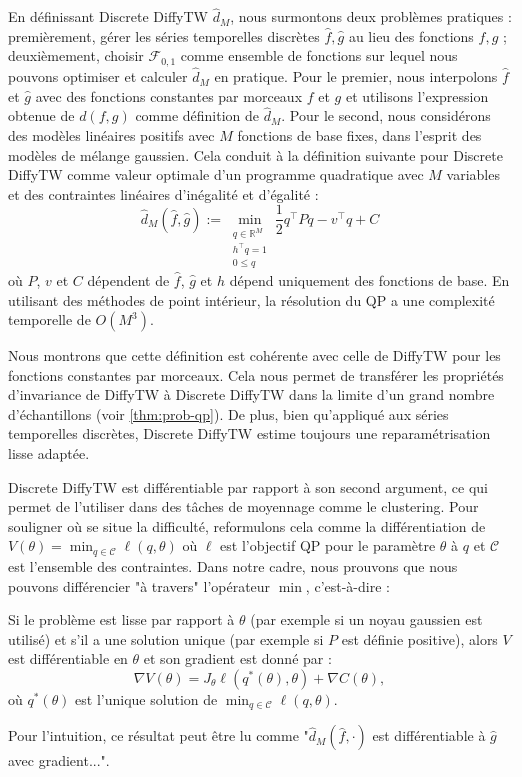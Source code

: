 En définissant Discrete DiffyTW $\hat d_M$, nous surmontons deux problèmes pratiques : premièrement, gérer les séries temporelles discrètes $\hat f, \hat g$ au lieu des fonctions $f, g$ ; deuxièmement, choisir $\mathcal F_{0,1}$ comme ensemble de fonctions sur lequel nous pouvons optimiser et calculer $\hat d_M$ en pratique. Pour le premier, nous interpolons $\hat f$ et $\hat g$ avec des fonctions constantes par morceaux $f$ et $g$ et utilisons l'expression obtenue de $d(f, g)$ comme définition de $\hat d_M$. Pour le second, nous considérons des modèles linéaires positifs avec $M$ fonctions de base fixes, dans l'esprit des modèles de mélange gaussien. Cela conduit à la définition suivante pour Discrete DiffyTW comme valeur optimale d'un programme quadratique avec $M$ variables et des contraintes linéaires d'inégalité et d'égalité :
\begin{equation*}
    \hat d_M(\hat f, \hat g) :=\min_{\substack{q\in\mathbb R^{M}\\h^\top q=1\\0 \leq q}}\frac{1}{2}q^\top Pq - v^\top q + C
\end{equation*}
où $P$, $v$ et $C$ dépendent de $\hat f$, $\hat g$ et $h$ dépend uniquement des fonctions de base. En utilisant des méthodes de point intérieur, la résolution du QP a une complexité temporelle de $O(M^3)$.

Nous montrons que cette définition est cohérente avec celle de DiffyTW pour les fonctions constantes par morceaux. Cela nous permet de transférer les propriétés d'invariance de DiffyTW à Discrete DiffyTW dans la limite d'un grand nombre d'échantillons (voir \cref{thm:prob-qp}). De plus, bien qu'appliqué aux séries temporelles discrètes, Discrete DiffyTW estime toujours une reparamétrisation lisse adaptée.

Discrete DiffyTW est différentiable par rapport à son second argument, ce qui permet de l'utiliser dans des tâches de moyennage comme le clustering. Pour souligner où se situe la difficulté, reformulons cela comme la différentiation de $V(\theta) = \min_{q\in\mathcal C}\ell(q, \theta)$ où $\ell$ est l'objectif QP pour le paramètre $\theta$ à $q$ et $\mathcal C$ est l'ensemble des contraintes. Dans notre cadre, nous prouvons que nous pouvons différencier "à travers" l'opérateur $\min$, c'est-à-dire :
\begin{mdframed}
\begin{informaltheorem}
Si le problème est lisse par rapport à $\theta$ (par exemple si un noyau gaussien est utilisé) et s'il a une solution unique (par exemple si $P$ est définie positive), alors $V$ est différentiable en $\theta$ et son gradient est donné par :
    \begin{equation}
        \nabla V(\theta) = J_\theta \ell(q^*(\theta), \theta) + \nabla C(\theta),
    \end{equation} où $q^*(\theta)$ est l'unique solution de $\min_{q\in\mathcal C}\ell(q, \theta)$.
\end{informaltheorem}
\end{mdframed}
Pour l'intuition, ce résultat peut être lu comme "$\hat d_M(\hat f, \cdot)$ est différentiable à $\hat g$ avec gradient...".

